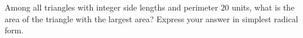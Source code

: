 Among all triangles with integer side lengths and perimeter $20$ units, what is the area of the triangle with the largest area? Express your answer in simplest radical form.
